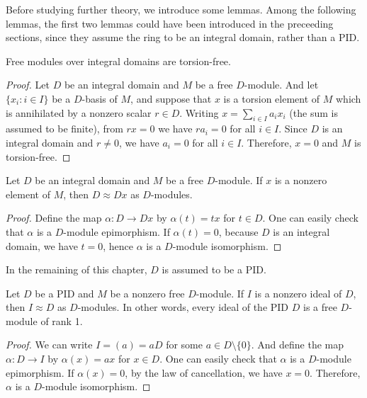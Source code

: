 Before studying further theory, we introduce some lemmas.
Among the following lemmas, the first two lemmas could have been introduced in the preceeding sections, since they assume the ring to be an integral domain, rather than a PID.
\begin{lem}\label{free modules over domains are torsion-free}
    Free modules over integral domains are torsion-free.
\end{lem}
\begin{proof}
    Let $D$ be an integral domain and $M$ be a free $D$-module.
    And let $\{x_i: i\in I\}$ be a $D$-basis of $M$, and suppose that $x$ is a torsion element of $M$ which is annihilated by a nonzero scalar $r\in D$.
    Writing $x=\sum_{i\in I}a_ix_i$ (the sum is assumed to be finite), from $rx=0$ we have $ra_i=0$ for all $i\in I$.
    Since $D$ is an integral domain and $r\neq 0$, we have $a_i=0$ for all $i\in I$.
    Therefore, $x=0$ and $M$ is torsion-free.
\end{proof}
\begin{lem}\label{integral domain is isomorphic to the rank 1 free module over itself}
    Let $D$ be an integral domain and $M$ be a free $D$-module.
    If $x$ is a nonzero element of $M$, then $D\approx Dx$ as $D$-modules.
\end{lem}
\begin{proof}
    Define the map $\alpha: D\rightarrow Dx$ by $\alpha(t)=tx$ for $t\in D$.
    One can easily check that $\alpha$ is a $D$-module epimorphism.
    If $\alpha(t)=0$, because $D$ is an integral domain, we have $t=0$, hence $\alpha$ is a $D$-module isomorphism.
\end{proof}
In the remaining of this chapter, $D$ is assumed to be a PID.
\begin{lem}\label{pid is isomorphic to its ideals}
    Let $D$ be a PID and $M$ be a nonzero free $D$-module.
    If $I$ is a nonzero ideal of $D$, then $I\approx D$ as $D$-modules.
    In other words, every ideal of the PID $D$ is a free $D$-module of rank 1.
\end{lem}
\begin{proof}
    We can write $I=(a)=aD$ for some $a\in D\setminus\{0\}$.
    And define the map $\alpha: D\rightarrow I$ by $\alpha(x)=ax$ for $x\in D$.
    One can easily check that $\alpha$ is a $D$-module epimorphism.
    If $\alpha(x)=0$, by the law of cancellation, we have $x=0$.
    Therefore, $\alpha$ is a $D$-module isomorphism.
\end{proof}

